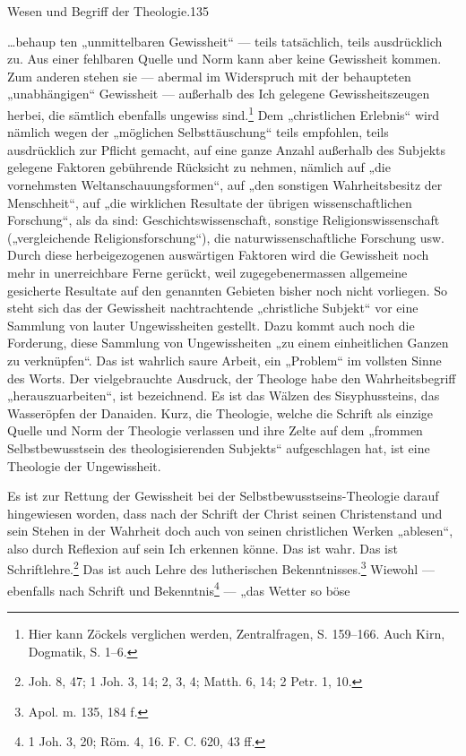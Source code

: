 Wesen und Begriff der Theologie.\hfill 135

\noindent \dots behaup
\mbox{}ten „unmittelbaren Gewissheit“ --- teils tatsächlich, teils ausdrücklich zu. Aus einer fehlbaren Quelle und Norm kann aber keine Gewissheit kommen. Zum anderen stehen sie --- abermal im Widerspruch mit der behaupteten „unabhängigen“ Gewissheit --- außerhalb des Ich gelegene Gewissheitszeugen herbei, die sämtlich ebenfalls ungewiss sind.\footnote{Hier kann Zöckels verglichen werden, Zentralfragen, S. 159--166. Auch Kirn, Dogmatik, S. 1--6.} Dem „christlichen Erlebnis“ wird nämlich wegen der „möglichen Selbsttäuschung“ teils empfohlen, teils ausdrücklich zur Pflicht gemacht, auf eine ganze Anzahl außerhalb des Subjekts gelegene Faktoren gebührende Rücksicht zu nehmen, nämlich auf „die vornehmsten Weltanschauungsformen“, auf „den sonstigen Wahrheitsbesitz der Menschheit“, auf „die wirklichen Resultate der übrigen wissenschaftlichen Forschung“, als da sind: Geschichtswissenschaft, sonstige Religionswissenschaft („vergleichende Religionsforschung“), die naturwissenschaftliche Forschung usw. Durch diese herbeigezogenen auswärtigen Faktoren wird die Gewissheit noch mehr in unerreichbare Ferne gerückt, weil zugegebenermassen allgemeine gesicherte Resultate auf den genannten Gebieten bisher noch nicht vorliegen. So steht sich das der Gewissheit nachtrachtende „christliche Subjekt“ vor eine Sammlung von lauter Ungewissheiten gestellt. Dazu kommt auch noch die Forderung, diese Sammlung von Ungewissheiten „zu einem einheitlichen Ganzen zu verknüpfen“. Das ist wahrlich saure Arbeit, ein „Problem“ im vollsten Sinne des Worts. Der vielgebrauchte Ausdruck, der Theologe habe den Wahrheitsbegriff „herauszuarbeiten“, ist bezeichnend. Es ist das Wälzen des Sisyphussteins, das Wasseröpfen der Danaiden. Kurz, die Theologie, welche die Schrift als einzige Quelle und Norm der Theologie verlassen und ihre Zelte auf dem „frommen Selbstbewusstsein des theologisierenden Subjekts“ aufgeschlagen hat, ist eine Theologie der Ungewissheit.

Es ist zur Rettung der Gewissheit bei der Selbstbewusstseins-Theologie darauf hingewiesen worden, dass nach der Schrift der Christ seinen Christenstand und sein Stehen in der Wahrheit doch auch von seinen christlichen Werken „ablesen“, also durch Reflexion auf sein Ich erkennen könne. Das ist wahr. Das ist Schriftlehre.\footnote{Joh. 8, 47; 1 Joh. 3, 14; 2, 3, 4; Matth. 6, 14; 2 Petr. 1, 10.} Das ist auch Lehre des lutherischen Bekenntnisses.\footnote{Apol. m. 135, 184 f.} Wiewohl --- ebenfalls nach Schrift und Bekenntnis\footnote{1 Joh. 3, 20; Röm. 4, 16. F. C. 620, 43 ff.} --- „das Wetter so böse